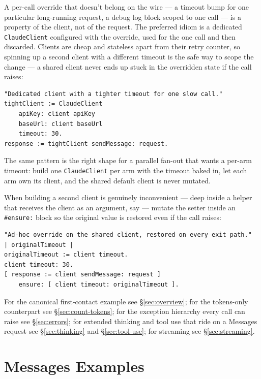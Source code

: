 \documentclass[a4paper,10pt,fleqn]{article}
\newcommand{\cls}[1]{\texttt{#1}}
\newcommand{\sel}[1]{\texttt{\##1}}
\begin{document}
A per-call override that doesn't belong on the wire --- a
timeout bump for one particular long-running request, a debug
log block scoped to one call --- is a property of the client,
not of the request.  The preferred idiom is a dedicated
\cls{ClaudeClient} configured with the override, used for the
one call and then discarded.  Clients are cheap and stateless
apart from their retry counter, so spinning up a second client
with a different timeout is the safe way to scope the change
--- a shared client never ends up stuck in the overridden state
if the call raises:

\begin{lstlisting}[language={}]
"Dedicated client with a tighter timeout for one slow call."
tightClient := ClaudeClient
    apiKey: client apiKey
    baseUrl: client baseUrl
    timeout: 30.
response := tightClient sendMessage: request.
\end{lstlisting}

The same pattern is the right shape for a parallel fan-out that
wants a per-arm timeout: build one \cls{ClaudeClient} per arm
with the timeout baked in, let each arm own its client, and the
shared default client is never mutated.

When building a second client is genuinely inconvenient ---
deep inside a helper that receives the client as an argument,
say --- mutate the setter inside an \sel{ensure:} block so the
original value is restored even if the call raises:

\begin{lstlisting}[language={}]
"Ad-hoc override on the shared client, restored on every exit path."
| originalTimeout |
originalTimeout := client timeout.
client timeout: 30.
[ response := client sendMessage: request ]
    ensure: [ client timeout: originalTimeout ].
\end{lstlisting}

For the canonical first-contact example see
\S\ref{sec:overview}; for the tokens-only counterpart see
\S\ref{sec:count-tokens}; for the exception hierarchy every
call can raise see \S\ref{sec:errors}; for extended thinking
and tool use that ride on a Messages request see
\S\ref{sec:thinking} and \S\ref{sec:tool-use}; for streaming
see \S\ref{sec:streaming}.

\medskip
{}

\section{Messages Examples}
\label{sec:messages-examples}
\end{document}
